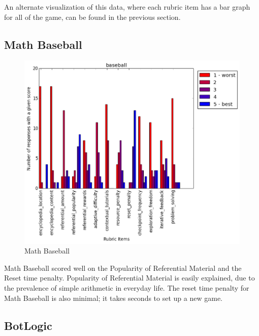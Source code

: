 			An alternate visualization of this data, where each rubric item has a bar graph for all of the game, can be found in the previous section.

			\subsection{Math Baseball}

				\begin{figure}[] 
				\centering 
				\includegraphics[width=\textwidth, height=.4\textheight, keepaspectratio=true]{baseball_scores.png} 
				\caption{Math Baseball}
				\end{figure}

				Math Baseball scored well on the Popularity of Referential Material and the Reset time penalty. Popularity of Referential Material is easily explained, due to the prevalence of simple arithmetic in everyday life. The reset time penalty for Math Baseball is also minimal; it takes seconds to set up a new game.

			\subsection{BotLogic}


